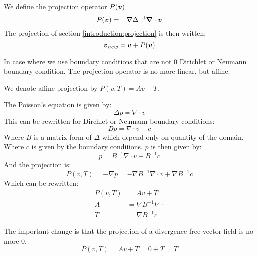 \begin{definition}
\label{introduction:projectiondef}
We define the projection operator $P({\boldsymbol {v}})$
  \begin{equation}
    P({\boldsymbol {v}})=-{\boldsymbol {\nabla}}\Delta^{-1}{\boldsymbol {\nabla}}\cdot {\boldsymbol {v}}
  \end{equation}
  The projection of section \ref{introduction:projection} is then written:
  \begin{equation}
    {\boldsymbol {v}}_{new}={\boldsymbol {v}}+P({\boldsymbol {v}})
  \end{equation}
\end{definition}

  In case where we use boundary conditions that are not 0 Dirichlet or Neumann boundary condition.
  The projection operator is no more linear, but affine.

  \begin{definition}
  We denote affine projection by $P(v,T)=Av+T$.
  
  The Poisson's equation is given by:
  \begin{equation}
   \Delta p=\nabla \cdot v
  \end{equation}
This can be rewritten for Dirchlet or Neumann boundary conditions:
\begin{equation}
 B p=\nabla \cdot v-c
\end{equation}
Where $B$ is a matrix form of $\Delta$ which depend only on quantity of the domain.
Where $c$ is given by the boundary conditions.
$p$ is then given by:
\begin{equation}
 p=B^{-1} \nabla \cdot v-B^{-1}c
\end{equation}
And the projection is:
\begin{equation}
 P(v,T)=-\nabla p=-\nabla B^{-1}\nabla \cdot v+\nabla B^{-1}c
\end{equation}
Which can be rewritten:
\begin{align}
P(v,T)&=Av+T\\
A&=\nabla B^{-1}\nabla \cdot\\
T&=\nabla B^{-1}c
\end{align}
  
  \end{definition}
  
  The important change is that the projection of a divergence free vector field is no more 0.
  \begin{equation}
  P(v,T)=Av+T=0+T=T
  \end{equation}



